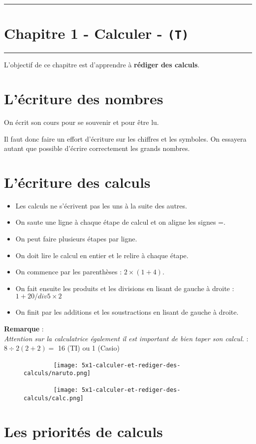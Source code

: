 \documentclass[11pt]{article}
\newcommand{\horrule}[1]{\rule{\linewidth}{#1}} %
\begin{document}
\setlength{\columnseprule}{1pt}

\horrule{2px}
\section*{Chapitre 1 - Calculer - \texttt{(T)}}
\horrule{2px}

L'objectif de ce chapitre est d'apprendre à \textbf{rédiger des calculs}.

\section*{L'écriture des nombres}

On écrit son cours pour se souvenir et pour être lu.

Il faut donc faire un effort d'écriture sur les chiffres et les symboles. On essayera autant que possible d'écrire correctement les grands nombres. 

\section*{L'écriture des calculs}

\begin{itemize}
  \item Les calculs ne s'écrivent pas les uns à la suite des autres. 
  \item On saute une ligne à chaque étape de calcul et on aligne les signes =.
  \item On peut faire plusieurs étapes par ligne.
\end{itemize}

\begin{itemize}
  \item On doit lire le calcul en entier et le relire à chaque étape.
  \item On commence par les parenthèses : $2 \times (1+4)$.
  \item On fait ensuite les produits et les divisions en lisant de gauche à droite : $1 + 20 /div 5 \times 2$
  \item On finit par les additions et les soustractions en lisant de gauche à droite.
\end{itemize}

\textbf{Remarque} : \\
\textit{Attention sur la calculatrice également il est important de bien taper son calcul. } : $8 \div 2(2+2) =$ 16 (TI) ou 1 (Casio)

\begin{minipage}[t]{0.5\textwidth}
  \begin{figure}[H]
        \centering
        \texttt{[image: 5x1-calculer-et-rediger-des-calculs/naruto.png]}
  \end{figure}
\end{minipage}
\begin{minipage}[t]{0.5\textwidth}
  \begin{figure}[H]
        \centering
        \texttt{[image: 5x1-calculer-et-rediger-des-calculs/calc.png]}
  \end{figure}
\end{minipage}



\section*{Les priorités de calculs}
\end{document}
